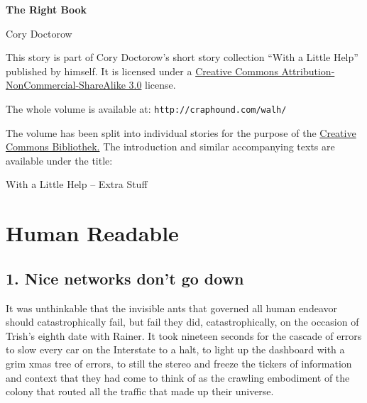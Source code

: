 


\raggedbottom

\begin{center}
\textbf{\huge\textsf{The Right Book}}

\medskip
Cory Doctorow

\end{center}

\bigskip

\begin{flushleft}
This story is part of Cory Doctorow’s short story collection
“With a Little Help” published by himself. It is licensed under a
\href{http://creativecommons.org/licenses/by-nc-sa/}
{Creative Commons Attribution-NonCommercial-ShareAlike 3.0} license.

\bigskip

The whole volume is available at:
\texttt{http://craphound.com/walh/}

\medskip

The volume has been split into individual stories for the purpose of the
\href{http://ccbib.org}{Creative Commons Bibliothek.}
The introduction and similar accompanying texts are available under the 
title:
\end{flushleft}
\begin{center}
With a Little Help -- Extra Stuff
\end{center}

\newpage

\section{Human Readable}

\subsection{1. Nice networks don't go down}

It was unthinkable that the invisible ants that governed all human 
endeavor should catastrophically fail, but fail they did, 
catastrophically, on the occasion of Trish's eighth date with Rainer. 
It took nineteen seconds for the cascade of errors to slow every car on 
the Interstate to a halt, to light up the dashboard with a grim xmas 
tree of errors, to still the stereo and freeze the tickers of 
information and context that they had come to think of as the crawling 
embodiment of the colony that routed all the traffic that made up their 
universe.


